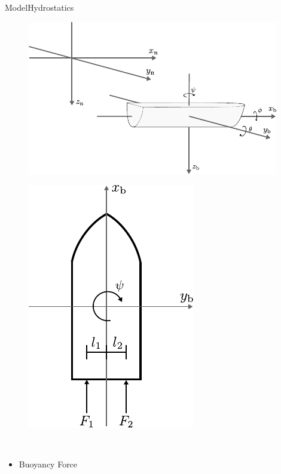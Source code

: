 \begin{frame}{Model}{Hydrostatics}
    \begin{minipage}{0.65\linewidth}
        \begin{figure}[H]
            \centering
            \includegraphics[width=1\linewidth]{figures/boat3D}
        \end{figure}        
    \end{minipage}\hfill      
    \begin{minipage}{0.3\linewidth}
        \begin{figure}[H]
            \centering
            \includegraphics[width=0.7\linewidth]{figures/boat2D}
        \end{figure}                
    \end{minipage}\hfill \\
    \begin{itemize}
        \item Buoyancy Force
    \end{itemize}
\end{frame}

